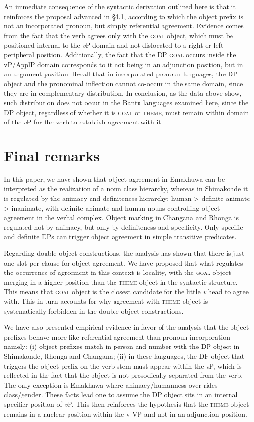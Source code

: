 \documentclass[output=paper]{langsci/langscibook}
\begin{document}
An immediate consequence of the syntactic derivation outlined here is that it reinforces the proposal advanced in §4.1, according to which the object prefix is not an incorporated pronoun, but simply referential agreement. Evidence comes from the fact that the verb agrees only with the \textsc{goal} object, which must be positioned internal to the {\textit{v}}P domain and not dislocated to a right or left-peripheral position. Additionally, the fact that the DP \textsc{goal} occurs inside the vP/ApplP domain corresponds to it not being in an adjunction position, but in an argument position. Recall that in incorporated pronoun languages, the DP object and the pronominal inflection cannot co-occur in the same domain, since they are in complementary distribution. In conclusion, as the data above show, such distribution does not occur in the Bantu languages examined here, since the DP object, regardless of whether it is \textsc{goal} or \textsc{theme}, must remain within domain of the {\textit{v}}P for the verb to establish agreement with it.

\section{Final remarks}

In this paper, we have shown that object agreement in Emakhuwa can be interpreted as the realization of a noun class hierarchy, whereas in Shimakonde it is regulated by the animacy and definiteness hierarchy: human {\textgreater} definite animate {\textgreater} inanimate, with definite animate and human nouns controlling object agreement in the verbal complex. Object marking in Changana and Rhonga is regulated not by animacy, but only by definiteness and specificity. Only specific and definite DPs can trigger object agreement in simple transitive predicates.

Regarding double object constructions, the analysis has shown that there is just one slot per clause for object agreement. We have proposed that what regulates the occurrence of agreement in this context is locality, with the \textsc{goal} object merging in a higher position than the \textsc{theme} object in the syntactic structure. This means that \textsc{goal} object is the closest candidate for the little {\textit{v}} head to agree with. This in turn accounts for why agreement with \textsc{theme} object is systematically forbidden in the double object constructions. 

We have also presented empirical evidence in favor of the analysis that the object prefixes behave more like referential agreement than pronoun incorporation, namely: (i) object prefixes match in person and number with the DP object in Shimakonde, Rhonga and Changana; (ii) in these languages, the DP object that triggers the object prefix on the verb stem must appear within the \textit{v}P, which is reflected in the fact that the object is not prosodically separated from the verb. The only exception is Emakhuwa where animacy/humanness over-rides class/gender. These facts lead one to assume the DP object sits in an internal specifier position of \textit{v}P. This then reinforces the hypothesis that the \textsc{theme} object remains in a nuclear position within the v-VP and not in an adjunction position.
\end{document}
